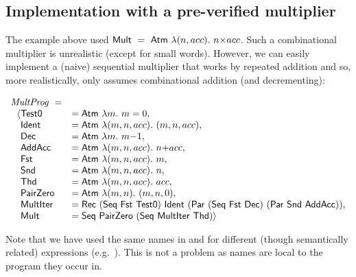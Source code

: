 \documentclass{llncs}
\begin{document}

\vspace*{-6mm}

\subsection{Implementation with a pre-verified multiplier}\label{preverified}

The example above used 
$\mathsf{Mult}~=~\mathsf{Atm}~\lambda (n,acc).~ n{\times}acc$. Such a combinational multiplier
is unrealistic (except for small words). However,
we can easily implement a (naive) sequential multiplier that works by
repeated addition and so, more realistically, only assumes
combinational addition (and decrementing):

\vspace*{-4mm}

$$
\begin{array}{ll}
\mathit{MultProg}~ =\\
~~ \langle \mathsf{Test0}    &= \mathsf{Atm}~\lambda m.~ m=0,\\
\phantom{~~ \langle}
  \mathsf{Ident}    &= \mathsf{Atm}~\lambda (m,n,acc).~ (m,n,acc),\\
\phantom{~~ \langle}
  \mathsf{Dec}      &= \mathsf{Atm}~\lambda m.~ m{-}1,\\
\phantom{~~ \langle}
  \mathsf{AddAcc}     &= \mathsf{Atm}~\lambda (m,n,acc).~ n{+}acc,\\
\phantom{~~ \langle}
  \mathsf{Fst}      &= \mathsf{Atm}~\lambda (m,n,acc).~m,\\
\phantom{~~ \langle}
  \mathsf{Snd}      &= \mathsf{Atm}~\lambda (m,n,acc).~n,\\
\phantom{~~ \langle}
  \mathsf{Thd}      &= \mathsf{Atm}~\lambda (m,n,acc).~acc,\\
\phantom{~~ \langle}
  \mathsf{PairZero}  &= \mathsf{Atm}~\lambda(m,n).~ (m,n,0),\\
\phantom{~~ \langle}
  \mathsf{MultIter} &= \mathsf{Rec~(Seq~Fst~Test0)~Ident~(Par~(Seq~Fst~Dec)~(Par~Snd~AddAcc))},\\
\phantom{~~ \langle}
  \mathsf{Mult}     &= \mathsf{Seq~PairZero~(Seq~MultIter~Thd)} \rangle
\end{array}
$$

\vspace*{-2mm}

Note that we have used the same names in  and  for
different (though semantically related) expressions (e.g.~).  This is not a problem
as names are local to the program they occur in.
\end{document}
